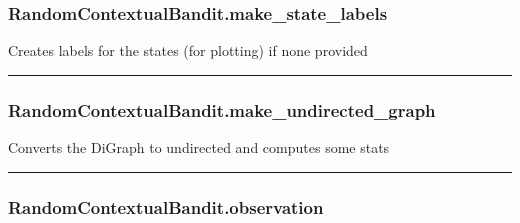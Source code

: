 \hypertarget{randomcontextualbandit.make_state_labels}{%
\subsubsection{RandomContextualBandit.make\_state\_labels}\label{randomcontextualbandit.make_state_labels}}

\begin{Shaded}
\begin{Highlighting}[]
\NormalTok{)}
\end{Highlighting}
\end{Shaded}

Creates labels for the states (for plotting) if none provided

\begin{center}\rule{0.5\linewidth}{\linethickness}\end{center}

\hypertarget{randomcontextualbandit.make_undirected_graph}{%
\subsubsection{RandomContextualBandit.make\_undirected\_graph}\label{randomcontextualbandit.make_undirected_graph}}

\begin{Shaded}
\begin{Highlighting}[]
\NormalTok{)}
\end{Highlighting}
\end{Shaded}

Converts the DiGraph to undirected and computes some stats

\begin{center}\rule{0.5\linewidth}{\linethickness}\end{center}

\hypertarget{randomcontextualbandit.observation}{%
\subsubsection{RandomContextualBandit.observation}\label{randomcontextualbandit.observation}}

\begin{Shaded}
\begin{Highlighting}[]
\NormalTok{)}
\end{Highlighting}
\end{Shaded}

